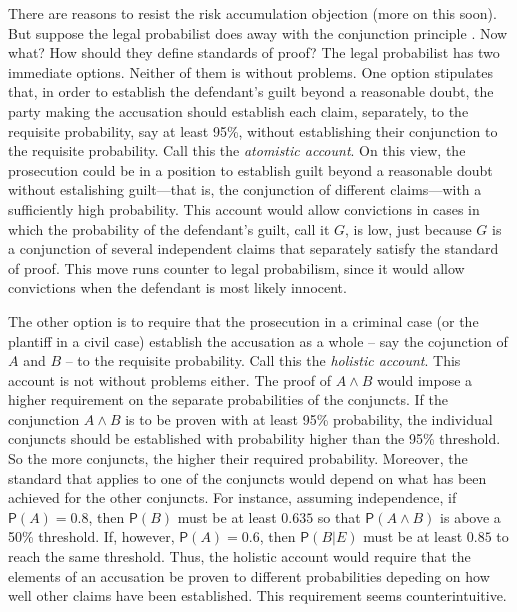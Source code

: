 \documentclass[10pt,dvipsnames,enabledeprecatedfontcommands]{scrartcl}
\newcommand{\et}{\wedge}
\newcommand{\pr}[1]{\mathsf{P}(#1)}
\begin{document}
There are reasons to resist the risk accumulation objection (more on
this soon).  But
suppose the legal probabilist does away with the conjunction principle
.
Now what? How should they define standards of proof? The legal
probabilist has two immediate options. Neither of them is without
problems. One option stipulates that, in order to establish the
defendant's guilt beyond a reasonable doubt, the party making the
accusation should establish each claim, separately, to the requisite
probability, say at least 95\%, without establishing their conjunction
to the requisite
probability.
Call this the \textit{atomistic account}. On this view, the prosecution
could be in a position to establish guilt beyond
a reasonable doubt without estalishing guilt---that is, the conjunction
of different claims---with a sufficiently high probability. This account
would allow convictions in cases in which the probability of the
defendant's guilt, call it \(G\), is low, just because \(G\) is a
conjunction of several independent claims that separately satisfy the
standard of proof. This move runs counter to legal probabilism, since it
would allow convictions when the defendant is most likely innocent.

The other option is to require that the prosecution in a criminal case
(or the plantiff in a civil case) establish the accusation as a whole --
say the cojunction of \(A\) and \(B\) -- to the requisite probability.
Call this the \textit{holistic account}. This account is not without
problems either. The proof of \(A\et B\) would impose a higher
requirement on the separate probabilities of the conjuncts. If the
conjunction \(A\et B\) is to be proven with at least 95\% probability,
the individual conjuncts should be established with probability higher
than the 95\% threshold. So the more conjuncts, the higher their
required probability. Moreover, the standard that applies to one of the
conjuncts would depend on what has been achieved for the other
conjuncts. For instance, assuming independence, if \(\pr{A}=0.8\), then
\(\pr{B}\) must be at least \(0.635\) so that \(\pr{A\et B}\) is above a
50\% threshold. If, however, \(\pr{A}=0.6\), then \(\pr{B\vert E}\) must
be at least \(0.85\) to reach the same threshold. Thus, the holistic
account would require that the elements of an accusation be proven to
different probabilities depeding on how well other claims have been
established. This requirement seems counterintuitive.
\end{document}
